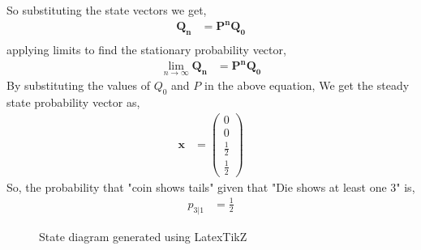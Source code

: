 \documentclass[journal,12pt,two column]{IEEEtran}
\newcommand{\myvec}[1]{\ensuremath{\begin{pmatrix}#1\end{pmatrix}}}
\let\vec\mathbf
\begin{document}
So substituting the state vectors we get,
\begin{align}
    \vec{Q_{n}}&=\vec{P^n Q_0}\\
\end{align}
applying limits to find the stationary probability vector,
\begin{align}
     \lim_{n \to \infty} \vec{Q_{n}}&=\vec{P^n Q_0}
\end{align} \label{eq:steady}
By substituting the values of $Q_0$ and $P$ in the above equation, We get the steady state probability vector as,
\begin{align}
    \vec{x}&=\myvec{0\\0\\\frac{1}{2}\\\frac{1}{2}}
\end{align}
So, the probability that "coin shows tails" given that "Die shows at least one 3" is,
\begin{align}
    p_{3|1} &= \frac{1}{2}
\end{align}
\begin{figure}[ht!]
    \centering
    \resizebox{.9\linewidth}{!}{}
    \caption{State diagram generated using LatexTikZ}
    \label{fig:Statediagramdiecoin}
\end{figure}
\end{document}
